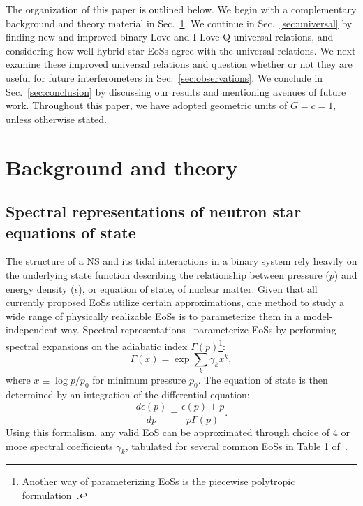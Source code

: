\documentclass[prd,twocolumn,nofootinbib,superscriptaddress,amsmath,amssymb]{revtex4-1}
\begin{document}
The organization of this paper is outlined below.
We begin with a complementary background and theory material in Sec.~\ref{sec:theory}.
We continue in Sec.~\ref{sec:universal} by finding new and improved binary Love and I-Love-Q universal relations, and considering how well hybrid star EoSs agree with the universal relations.
We next examine these improved universal relations and question whether or not they are useful for future interferometers in Sec.~\ref{sec:observations}.
We conclude in Sec.~\ref{sec:conclusion} by discussing our results and mentioning avenues of future work.
Throughout this paper, we have adopted geometric units of $G=c=1$, unless otherwise stated.

\section{Background and theory}\label{sec:theory}

\subsection{Spectral representations of neutron star equations of state}\label{sec:eos}
The structure of a NS and its tidal interactions in a binary system rely heavily on the underlying state function describing the relationship between pressure ($p$) and energy density ($\epsilon$), or equation of state, of nuclear matter.
Given that all currently proposed EoSs utilize certain approximations, one method to study a wide range of physically realizable EoSs is to parameterize them in a model-independent way.
Spectral representations~\cite{Lindblom:2010bb,Lindblom:2012zi,Lindblom:2013kra,Lindblom:2018rfr,Abbott:2018exr} parameterize EoSs by performing spectral expansions on the adiabatic index $\Gamma(p)$\footnote{Another way of parameterizing EoSs is the piecewise polytropic formulation~\cite{Read2009,Lackey:2014fwa,Carney:2018sdv}.}:
\begin{equation}
\Gamma(x) = \exp{\sum_k\gamma_k x^k},
\end{equation}
where $x \equiv \log{p/p_0}$ for minimum pressure $p_0$.
The equation of state is then determined by an integration of the differential equation:
\begin{equation}
\frac{d \epsilon(p)}{dp}=\frac{\epsilon(p)+p}{p \Gamma(p)}.
\end{equation}
Using this formalism, any valid EoS can be approximated through choice of 4 or more spectral coefficients $\gamma_k$, tabulated for several common EoSs in Table 1 of~\cite{Lindblom:2018rfr}.
\end{document}
